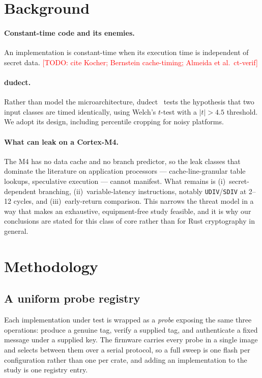 \documentclass[11pt,a4paper]{article}
\newcommand{\todo}[1]{\textcolor{red}{[TODO: #1]}}
\begin{document}
\section{Background}

\paragraph{Constant-time code and its enemies.}
An implementation is constant-time when its execution time is independent of
secret data. \todo{cite Kocher; Bernstein cache-timing; Almeida et al.\ ct-verif}

\paragraph{dudect.}
Rather than model the microarchitecture, dudect~\cite{dudect} tests the
hypothesis that two input classes are timed identically, using Welch's
$t$-test with a $|t| > 4.5$ threshold. We adopt its design, including
percentile cropping for noisy platforms.

\paragraph{What can leak on a Cortex-M4.}
The M4 has no data cache and no branch predictor, so the leak classes that
dominate the literature on application processors --- cache-line-granular table
lookups, speculative execution --- cannot manifest. What remains is
(i)~secret-dependent branching, (ii)~variable-latency instructions, notably
\texttt{UDIV}/\texttt{SDIV} at 2--12 cycles, and (iii)~early-return comparison.
This narrows the threat model in a way that makes an exhaustive, equipment-free
study feasible, and it is why our conclusions are stated for this class of core
rather than for Rust cryptography in general.

\section{Methodology}

\subsection{A uniform probe registry}
Each implementation under test is wrapped as a \emph{probe} exposing the same
three operations: produce a genuine tag, verify a supplied tag, and authenticate
a fixed message under a supplied key. The firmware carries every probe in a
single image and selects between them over a serial protocol, so a full sweep is
one flash per configuration rather than one per crate, and adding an
implementation to the study is one registry entry.
\end{document}
